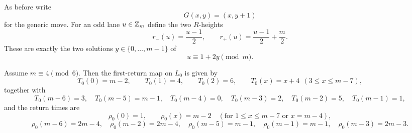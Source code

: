 As before write
\[
G(x,y)=(x,y+1)
\]
for the generic move.
For an odd lane $u\in \mathbb Z_m$ define the two $R$-heights
\[
r_-(u)=\frac{u-1}{2},
\qquad
r_+(u)=\frac{u-1}{2}+\frac m2.
\]
These are exactly the two solutions $y\in \{0,\dots,m-1\}$ of
\[
u\equiv 1+2y\pmod m.
\]

\begin{proposition}\label{prop:R0-caseII-data}
Assume $m\equiv 4\pmod 6$.
Then the first-return map on $L_0$ is given by
\[
T_0(0)=m-2,\qquad T_0(1)=4,\qquad T_0(2)=6,\qquad T_0(x)=x+4\ \ (3\le x\le m-7),
\]
together with
\[
T_0(m-6)=3,\quad T_0(m-5)=m-1,\quad T_0(m-4)=0,\quad T_0(m-3)=2,\quad T_0(m-2)=5,\quad T_0(m-1)=1,
\]
and the return times are
\[
\rho_0(0)=1,\qquad \rho_0(x)=m-2 \quad (\text{for } 1\le x\le m-7 \text{ or } x=m-4),
\]
\[
\rho_0(m-6)=2m-4,\quad \rho_0(m-2)=2m-4,\quad \rho_0(m-5)=m-1,\quad \rho_0(m-1)=m-1,\quad
\rho_0(m-3)=2m-3.
\]
\end{proposition}


